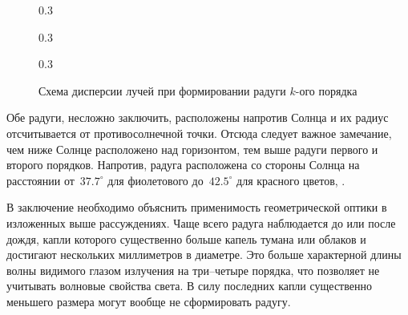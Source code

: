 \begin{figure}[h!]
    \begin{subcaptionblock}{0.3\tw}
        \centering
        \caption{$k=1$}
        \label{pic:rainbow-disp-1}
    \end{subcaptionblock}
    \hfill
    \begin{subcaptionblock}{0.3\tw}
        \centering
        \caption{$k=2$}
        \label{pic:rainbow-disp-2}
    \end{subcaptionblock}
    \hfill
    \begin{subcaptionblock}{0.3\tw}
        \centering
        \caption{$k=3$}
        \label{pic:rainbow-disp-3}
    \end{subcaptionblock}
    \caption{Схема дисперсии лучей при формировании радуги $k$-ого порядка}
\end{figure}

Обе радуги, несложно заключить, расположены напротив Солнца и их радиус отсчитывается от противосолнечной точки. Отсюда следует важное замечание, чем ниже Солнце расположено над горизонтом, тем выше радуги первого и второго порядков. Напротив,  радуга расположена со стороны Солнца на расстоянии от~$37.7^\circ$ для фиолетового до~$42.5^\circ$ для красного цветов, .

В заключение необходимо объяснить применимость геометрической оптики в изложенных выше рассуждениях. Чаще всего радуга наблюдается до или после дождя, капли которого существенно больше капель тумана или облаков и достигают нескольких миллиметров в диаметре. Это больше характерной длины волны видимого глазом излучения на три--четыре порядка, что позволяет не учитывать волновые свойства света. В силу последних капли существенно меньшего размера могут вообще не сформировать радугу. 